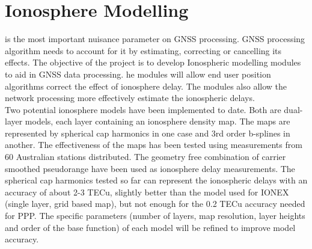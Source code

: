 \chapter{Ionosphere Modelling}
\label{ch:ionosphere_modelling}
%
 is the most important nuisance parameter on GNSS processing. 
GNSS processing algorithm needs to account for it by estimating, correcting or cancelling its effects. 
The objective of the project is to develop Ionospheric modelling modules to aid in GNSS data processing. 
he modules will allow end user position algorithms correct the effect of ionosphere delay. 
The modules also allow the network processing more effectively estimate the ionospheric delays.
\\
%
Two potential ionosphere models have been implemented to date. 
Both are dual-layer models, each layer containing an ionosphere density map. 
The maps are represented by spherical cap harmonics in one case and 3rd order b-splines in another. 
The effectiveness of the maps has been tested using measurements from 60 Australian stations distributed. 
The geometry free combination of carrier smoothed pseudorange have been used as ionosphere delay measurements. 
The spherical cap harmonics tested so far can represent the ionospheric delays with an accuracy of about 2-3 TECu, slightly better than the model used for IONEX (single layer, grid based map), but not enough for the 0.2 TECu accuracy needed for PPP. 
The specific parameters (number of layers, map resolution, layer heights and order of the base function) of each model will be refined to improve model accuracy.
\\
%

